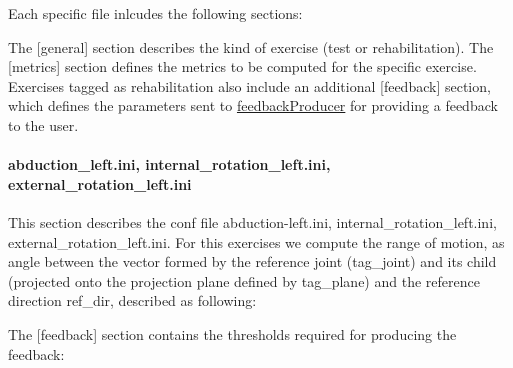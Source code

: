 Each specific file inlcudes the following sections\+:


\begin{DoxyCode}{0}
\DoxyCodeLine{[general]}
\DoxyCodeLine{}
\DoxyCodeLine{[metrics]}
\end{DoxyCode}


The {\ttfamily \mbox{[}general\mbox{]}} section describes the kind of exercise (test or rehabilitation). The {\ttfamily \mbox{[}metrics\mbox{]}} section defines the metrics to be computed for the specific exercise. Exercises tagged as {\ttfamily rehabilitation} also include an additional {\ttfamily \mbox{[}feedback\mbox{]}} section, which defines the parameters sent to \mbox{\hyperlink{group__feedbackProducer}{feedback\+Producer}} for providing a feedback to the user.\hypertarget{group__motionAnalyzer_sec-abduction}{}\paragraph{abduction\+\_\+left.\+ini, internal\+\_\+rotation\+\_\+left.\+ini, external\+\_\+rotation\+\_\+left.\+ini}\label{group__motionAnalyzer_sec-abduction}
This section describes the conf file abduction-\/left.\+ini, internal\+\_\+rotation\+\_\+left.\+ini, external\+\_\+rotation\+\_\+left.\+ini. For this exercises we compute the range of motion, as angle between the vector formed by the reference joint ({\ttfamily tag\+\_\+joint}) and its child (projected onto the projection plane defined by {\ttfamily tag\+\_\+plane}) and the reference direction {\ttfamily ref\+\_\+dir}, described as following\+:


\begin{DoxyCode}{0}
\DoxyCodeLine{[ROM\_0]}
\end{DoxyCode}


The {\ttfamily \mbox{[}feedback\mbox{]}} section contains the thresholds required for producing the feedback\+:


\begin{DoxyCode}{0}
\DoxyCodeLine{[feedback]}
\end{DoxyCode}


